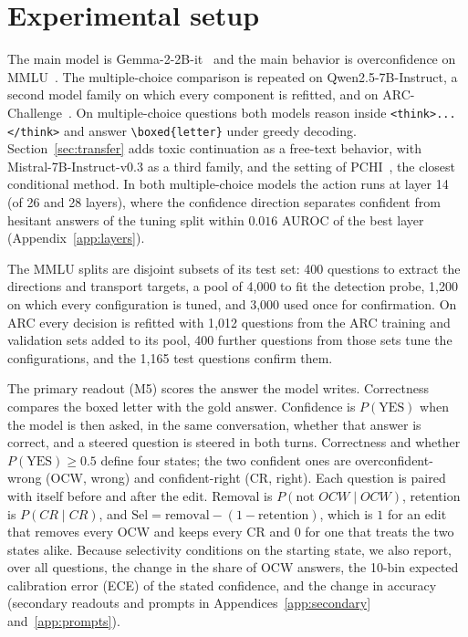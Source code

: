 \documentclass{article}
\newcommand{\ocw}{OCW}
\newcommand{\crok}{CR}
\begin{document}
\section{Experimental setup}
\label{sec:exp}\label{sec:data}

The main model is Gemma-2-2B-it~\citep{gemma2024} and the main behavior is
overconfidence on MMLU~\citep{hendrycks2021mmlu}. The multiple-choice
comparison is repeated on Qwen2.5-7B-Instruct, a second model family on which
every component is refitted, and on ARC-Challenge~\citep{clark2018arc}. On
multiple-choice questions both models reason inside
\texttt{<think>...</think>} and answer \verb|\boxed{letter}| under greedy
decoding. Section~\ref{sec:transfer} adds toxic continuation as a
free-text behavior, with Mistral-7B-Instruct-v0.3 as a third family, and the
setting of PCHI~\citep{liu2026probe}, the closest conditional method. In both
multiple-choice models the action runs at layer 14 (of 26 and 28 layers),
where the confidence direction separates confident from hesitant answers of the
tuning split within $0.016$ AUROC of the best layer
(Appendix~\ref{app:layers}).

The MMLU splits are disjoint subsets of its test set: 400 questions to extract
the directions and transport targets, a pool of 4{,}000 to fit the detection
probe, 1{,}200 on which every configuration is tuned, and 3{,}000 used once for
confirmation. On ARC every decision is refitted with 1{,}012 questions from the
ARC training and validation sets added to its pool, 400 further questions from
those sets tune the configurations, and the 1{,}165 test questions confirm
them.

The primary readout (M5) scores the answer the model writes. Correctness
compares the boxed letter with the gold answer. Confidence is
$P(\mathrm{YES})$ when the model is then asked, in the same conversation,
whether that answer is correct, and a steered question is steered in both
turns. Correctness and whether $P(\mathrm{YES})\ge0.5$ define four states;
the two confident ones are overconfident-wrong (\ocw{}, wrong) and
confident-right (\crok{}, right). Each question is paired with itself before
and after the edit. Removal is $P(\text{not }\ocw\mid\ocw)$, retention is
$P(\crok\mid\crok)$, and $\mathrm{Sel}=\text{removal}-(1-\text{retention})$,
which is $1$ for an edit that removes every \ocw{} and keeps every \crok{} and
$0$ for one that treats the two states alike. Because selectivity conditions on
the starting state, we also report, over all questions, the change in the share
of \ocw{} answers, the 10-bin expected calibration error (ECE) of the stated
confidence, and the change in accuracy (secondary readouts and prompts in
Appendices~\ref{app:secondary} and~\ref{app:prompts}).
\end{document}
